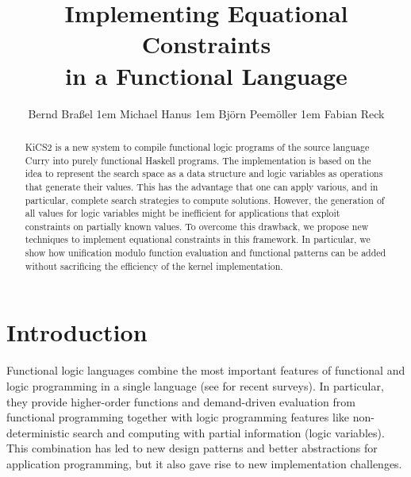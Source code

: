 \documentclass{llncs}
\begin{document}
\pagestyle{plain}
\sloppy

\title{Implementing Equational Constraints\\ in a Functional Language}

\author{
Bernd Bra{\ss}el
\kern1em
Michael Hanus
\kern1em
Bj{\"o}rn Peem{\"o}ller
\kern1em
Fabian Reck
}

\maketitle

\begin{abstract}
KiCS2 is a new system
to compile functional logic programs of the source language Curry
into purely functional Haskell programs.
The implementation is based on the idea to represent
the search space as a data structure and logic variables
as operations that generate their values.
This has the advantage that one can apply various,
and in particular, complete search strategies to compute solutions.
However, the generation of all values for logic variables
might be inefficient for applications that
exploit constraints on partially known values.
To overcome this drawback, we propose new techniques
to implement equational constraints in this framework.
In particular, we show how unification modulo function evaluation
and functional patterns can be added without sacrificing
the efficiency of the kernel implementation.
\end{abstract}


\section{Introduction}
\label{sec:Introduction}

Functional logic languages combine the most important
features of functional and logic programming in a single language
(see \cite{AntoyHanus10CACM,Hanus07ICLP} for recent surveys).
In particular, they provide higher-order functions and demand-driven
evaluation from functional programming together with logic programming features
like non-deterministic search and computing with partial information
(logic variables).
This combination
has led to new design patterns \cite{AntoyHanus02FLOPS,AntoyHanus11WFLP}
and better abstractions for application programming, but it also gave rise
to new implementation challenges.
\end{document}
